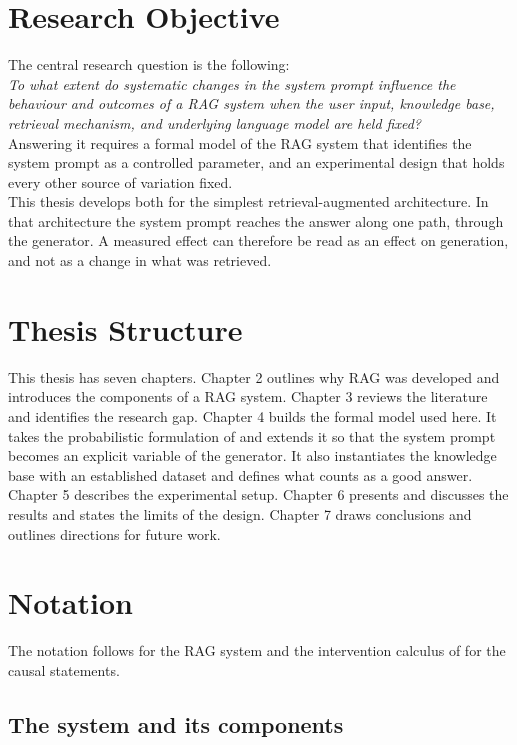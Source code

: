 \documentclass[12pt,a4paper,oneside]{scrreprt}
\begin{document}
\section{Research Objective}
The central research question is the following: \\
\textit{To what extent do
systematic changes in the system prompt influence the behaviour and outcomes of a
RAG system when the user input, knowledge base, retrieval mechanism, and
underlying language model are held fixed?} \\
Answering it requires a formal model of the RAG system that identifies the
system prompt as a controlled parameter, and an experimental design that holds
every other source of variation fixed. \\
This thesis develops both for the simplest
retrieval-augmented architecture. In that architecture the system prompt reaches
the answer along one path, through the generator. A measured effect can
therefore be read as an effect on generation, and not as a change in what was
retrieved.


\section{Thesis Structure}

This thesis has seven chapters. Chapter 2 outlines why RAG was developed and introduces the components of a
RAG system. Chapter 3 reviews the literature and identifies the research gap. Chapter 4 builds the formal model used here. It takes the probabilistic formulation of \citet{lewis2020rag} and extends it so that the system prompt becomes an explicit variable of the generator. It also instantiates the knowledge base with an established dataset and defines what counts as a good answer.
Chapter 5 describes the experimental setup. Chapter 6 presents and discusses the
results and states the limits of the design. Chapter 7 draws conclusions and outlines directions for future work.


\section*{Notation}
\label{sec:notation}

The notation follows \citet{lewis2020rag} for the RAG system and the intervention calculus of \citet{pearl2009causality} for the causal statements. 

\subsection*{The system and its components}
\end{document}
